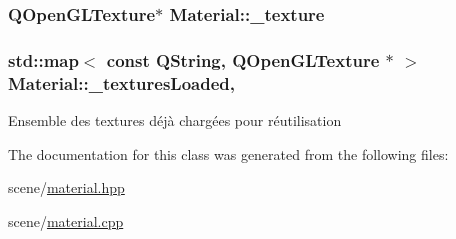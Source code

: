 \hypertarget{class_material_a4e94f174d1785f0912574fee4ae2fbc2}{
\subsubsection[{\+\_\+texture}]{\setlength{\rightskip}{0pt plus 5cm}Q\+Open\+G\+L\+Texture$\ast$ Material\+::\+\_\+texture\hspace{0.3cm}{\ttfamily [private]}}}\label{class_material_a4e94f174d1785f0912574fee4ae2fbc2}
\hypertarget{class_material_a9ccbb6b22b224284050b4d6c172829fc}{
\subsubsection[{\+\_\+textures\+Loaded}]{\setlength{\rightskip}{0pt plus 5cm}std\+::map$<$ const Q\+String, Q\+Open\+G\+L\+Texture $\ast$ $>$ Material\+::\+\_\+textures\+Loaded\hspace{0.3cm}{\ttfamily [static]}, {\ttfamily [private]}}}\label{class_material_a9ccbb6b22b224284050b4d6c172829fc}
Ensemble des textures déjà chargées pour réutilisation 

The documentation for this class was generated from the following files\+:\begin{DoxyCompactItemize}
\item 
scene/\hyperlink{material_8hpp}{material.\+hpp}\item 
scene/\hyperlink{material_8cpp}{material.\+cpp}\end{DoxyCompactItemize}

